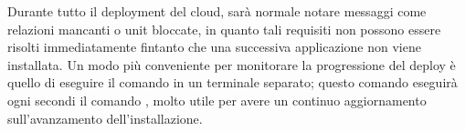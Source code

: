 Durante tutto il deployment del cloud, sarà normale notare messaggi come relazioni mancanti o unit bloccate, in quanto tali requisiti non possono essere risolti immediatamente fintanto che una successiva applicazione non viene installata.
% 
Un modo più conveniente per monitorare la progressione del deploy è quello di eseguire il comando  in un terminale separato; 
% 
questo comando eseguirà ogni  secondi il comando , molto utile per avere un continuo aggiornamento sull'avanzamento dell'installazione.


\newpage


\newpage


\newpage


